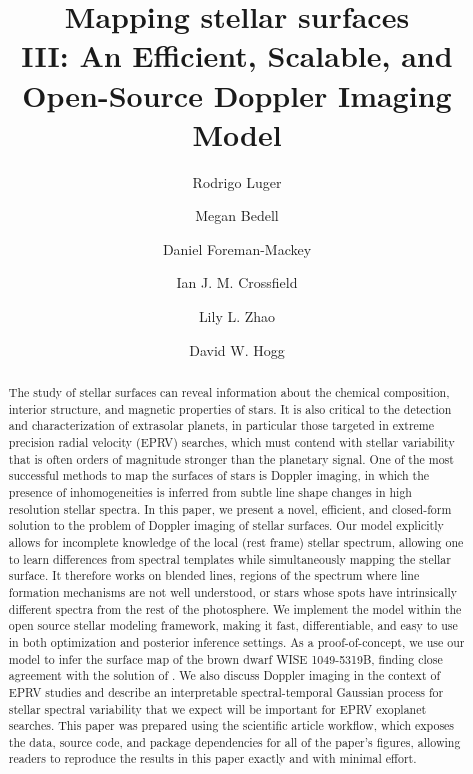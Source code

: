 \documentclass[modern]{aastex631}
\begin{document}
\title{%
    Mapping stellar surfaces\\
    III: An Efficient, Scalable, and Open-Source Doppler Imaging Model
}

\author[0000-0002-0296-3826]{Rodrigo Luger}
%
\author[0000-0001-9907-7742]{Megan Bedell}
%
\author[0000-0002-9328-5652]{Daniel Foreman-Mackey}
%
\author[0000-0002-1835-1891]{Ian J. M. Crossfield}
%
\author[0000-0002-3852-3590]{Lily L. Zhao}
%
\author[0000-0003-2866-9403]{David W. Hogg}

\begin{abstract}
    The study of stellar surfaces can reveal information about the chemical composition, interior structure, and magnetic properties of stars.
    It is also critical to the detection and characterization of extrasolar planets, in particular those targeted in extreme precision radial velocity (EPRV) searches, which must contend with stellar variability that is often orders of magnitude stronger than the planetary signal.
    One of the most successful methods to map the surfaces of stars is Doppler imaging, in which the presence of inhomogeneities is inferred from subtle line shape changes in high resolution stellar spectra.
    In this paper, we present a novel, efficient, and closed-form solution to the problem of Doppler imaging of stellar surfaces.
    Our model explicitly allows for incomplete knowledge of the local (rest frame) stellar spectrum, allowing one to learn differences from spectral templates while simultaneously mapping the stellar surface. 
    It therefore works on blended lines, regions of the spectrum where line formation mechanisms are not well understood, or stars whose spots have intrinsically different spectra from the rest of the photosphere.
    We implement the model within the open source \starry stellar modeling framework, making it fast, differentiable, and easy to use in both optimization and posterior inference settings.
    As a proof-of-concept, we use our model to infer the surface map of the brown dwarf WISE 1049-5319B, finding close agreement with the solution of \citet{Crossfield2014}.
    We also discuss Doppler imaging in the context of EPRV studies and describe an interpretable spectral-temporal Gaussian process for stellar spectral variability that we expect will be important for EPRV exoplanet searches.
    This paper was prepared using the \showyourwork scientific article workflow, which exposes the data, source code, and package dependencies for all of the paper's figures, allowing readers to reproduce the results in this paper exactly and with minimal effort.
\end{abstract}
\end{document}

